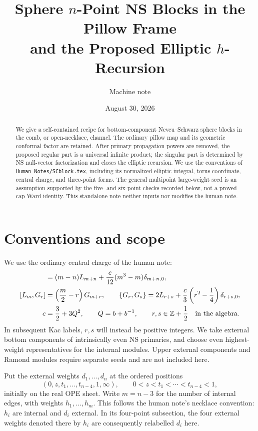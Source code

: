 \documentclass[11pt]{article}
\title{Sphere \texorpdfstring{$n$}{n}-Point NS Blocks in the Pillow Frame\\
and the Proposed Elliptic \texorpdfstring{$h$}{h}-Recursion}
\author{Machine note}
\date{August 30, 2026}
\numberwithin{equation}{section}
\begin{document}
\maketitle

\begin{abstract}
We give a self-contained recipe for bottom-component Neveu--Schwarz
sphere blocks in the comb, or open-necklace, channel. The ordinary pillow
map and its geometric conformal factor are retained. After primary
propagation powers are removed, the proposed regular part is a universal
infinite product; the singular part is determined by NS null-vector
factorization and closes the elliptic recursion. We use the conventions
of \texttt{Human Notes/SCblock.tex}, including its normalized elliptic
integral, torus coordinate, central charge, and three-point forms. The
general multipoint large-weight seed is an assumption supported by the
five- and six-point checks recorded below, not a proved cap Ward identity. This
standalone note neither inputs nor modifies the human note.
\end{abstract}

\section{Conventions and scope}
\label{sec:conventions}

We use the ordinary central charge of the human note:
\begin{align}
 [L_m,L_n]&=(m-n)L_{m+n}
       +\frac{c}{12}(m^3-m)\delta_{m+n,0},\notag\\
 [L_m,G_r]&=\left(\frac m2-r\right)G_{m+r},\qquad
 \{G_r,G_s\}=2L_{r+s}
       +\frac c3\left(r^2-\frac14\right)\delta_{r+s,0},
 \label{eq:algebra}\\
 c&=\frac32+3Q^2,\qquad Q=b+b^{-1},\qquad
 r,s\in\mathbb Z+\frac12\quad\hbox{in the algebra}.
 \notag
\end{align}
In subsequent Kac labels, $r,s$ will instead be positive integers.
We take external bottom components of intrinsically even NS primaries,
and choose even highest-weight representatives for the internal modules.
Upper external components and Ramond modules require separate seeds and
are not included here.

Put the external weights $d_1,\ldots,d_n$ at the ordered positions
\begin{equation}
 (0,z,t_1,\ldots,t_{n-4},1,\infty),\qquad
 0<z<t_1<\cdots<t_{n-4}<1,
 \label{eq:positions}
\end{equation}
initially on the real OPE sheet. Write $m=n-3$ for the number of internal
edges, with weights $h_1,\ldots,h_m$. This follows the human note's
necklace convention: $h_i$ are internal and $d_i$ external. In its
four-point subsection, the four external weights denoted there by $h_i$
are consequently relabelled $d_i$ here.
\end{document}
